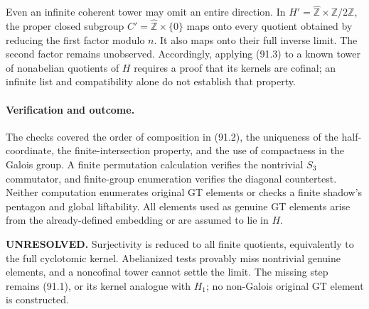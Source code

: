 \documentclass[11pt]{article}
\begin{document}
Even an infinite coherent tower may omit an entire direction. In $H'=\widehat{\mathbb Z}\times\mathbb Z/2\mathbb Z$, the proper closed subgroup $C'=\widehat{\mathbb Z}\times\{0\}$ maps onto every quotient obtained by reducing the first factor modulo $n$. It also maps onto their full inverse limit. The second factor remains unobserved. Accordingly, applying (91.3) to a known tower of nonabelian quotients of $H$ requires a proof that its kernels are cofinal; an infinite list and compatibility alone do not establish that property.

\paragraph{Verification and outcome.}
The checks covered the order of composition in (91.2), the uniqueness of the half-coordinate, the finite-intersection property, and the use of compactness in the Galois group. A finite permutation calculation verifies the nontrivial $S_3$ commutator, and finite-group enumeration verifies the diagonal countertest. Neither computation enumerates original GT elements or checks a finite shadow's pentagon and global liftability. All elements used as genuine GT elements arise from the already-defined embedding or are assumed to lie in $H$.

\textbf{UNRESOLVED.} Surjectivity is reduced to all finite quotients, equivalently to the full cyclotomic kernel. Abelianized tests provably miss nontrivial genuine elements, and a noncofinal tower cannot settle the limit. The missing step remains (91.1), or its kernel analogue with $H_1$; no non-Galois original GT element is constructed.
\end{document}
